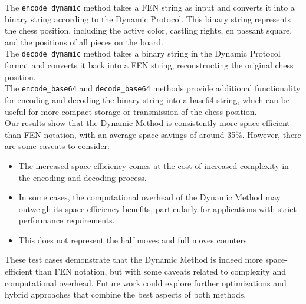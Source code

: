 \documentclass{article}
\begin{document}
The \verb|encode_dynamic| method takes a FEN string as input and converts it into a binary string according to the Dynamic Protocol. This binary string represents the chess position, including the active color, castling rights, en passant square, and the positions of all pieces on the board.  \\

The \verb|decode_dynamic| method takes a binary string in the Dynamic Protocol format and converts it back into a FEN string, reconstructing the original chess position.  \\

The \verb|encode_base64| and \verb|decode_base64| methods provide additional functionality for encoding and decoding the binary string into a base64 string, which can be useful for more compact storage or transmission of the chess position. \\

Our results show that the Dynamic Method is consistently more space-efficient than FEN notation, with an average space savings of around 35\%. However, there are some caveats to consider:  

\begin{itemize}  
    \item The increased space efficiency comes at the cost of increased complexity in the encoding and decoding process.
    \item In some cases, the computational overhead of the Dynamic Method may outweigh its space efficiency benefits, particularly for applications with strict performance requirements.  
    \item This does not represent the half moves and full moves counters
\end{itemize}  
   
These test cases demonstrate that the Dynamic Method is indeed more space-efficient than FEN notation, but with some caveats related to complexity and computational overhead. Future work could explore further optimizations and hybrid approaches that combine the best aspects of both methods.

\newpage
\end{document}
